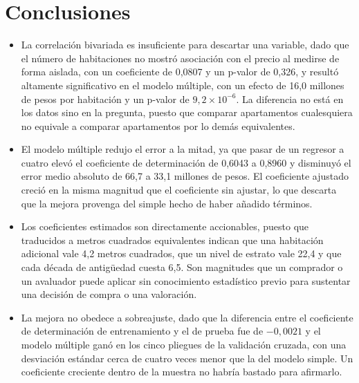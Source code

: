 \section{Conclusiones}
    \begin{itemize}
        \item La correlación bivariada es insuficiente para descartar una variable,
        dado que el número de habitaciones no mostró asociación con el precio al
        medirse de forma aislada, con un coeficiente de 0,0807 y un p-valor de
        0,326, y resultó altamente significativo en el modelo múltiple, con un
        efecto de 16,0 millones de pesos por habitación y un p-valor de
        $9{,}2 \times 10^{-6}$. La diferencia no está en los datos sino en la
        pregunta, puesto que comparar apartamentos cualesquiera no equivale a
        comparar apartamentos por lo demás equivalentes.

        \vspace{10pt}

        \item El modelo múltiple redujo el error a la mitad, ya que pasar de un
        regresor a cuatro elevó el coeficiente de determinación de 0,6043 a 0,8960
        y disminuyó el error medio absoluto de 66,7 a 33,1 millones de pesos. El
        coeficiente ajustado creció en la misma magnitud que el coeficiente sin
        ajustar, lo que descarta que la mejora provenga del simple hecho de haber
        añadido términos.

        \vspace{10pt}

        \item Los coeficientes estimados son directamente accionables, puesto que
        traducidos a metros cuadrados equivalentes indican que una habitación
        adicional vale 4,2 metros cuadrados, que un nivel de estrato vale 22,4 y
        que cada década de antigüedad cuesta 6,5. Son magnitudes que un comprador o
        un avaluador puede aplicar sin conocimiento estadístico previo para
        sustentar una decisión de compra o una valoración.

        \vspace{10pt}

        \item La mejora no obedece a sobreajuste, dado que la diferencia entre el
        coeficiente de determinación de entrenamiento y el de prueba fue de
        $-0{,}0021$ y el modelo múltiple ganó en los cinco pliegues de la
        validación cruzada, con una desviación estándar cerca de cuatro veces menor
        que la del modelo simple. Un coeficiente creciente dentro de la muestra no
        habría bastado para afirmarlo.


\end{itemize}

